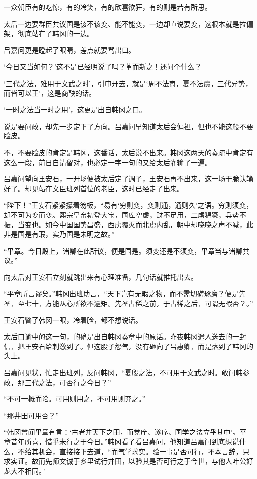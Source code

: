 一众朝臣有的吃惊，有的冷笑，有的欣喜欲狂，有的则是若有所思。

太后一边要群臣共议国是该不该变、能不能变，一边却直说要变，这根本就是拉偏架，彻底站在了韩冈的一边。

吕嘉问更是瞪起了眼睛，差点就要骂出口。

‘今日又当如何？’这不是已经明说了吗？革而新之！还问个什么？

‘三代之法，难用于文武之时’，引申开去，就是‘周不法商，夏不法虞，三代异势，而皆可以王’，这是商鞅的话。

‘一时之法当一时之用’，这更是出自韩冈之口。

说是要问政，却先一步定下了方向。吕嘉问早知道太后会偏袒，但也不能这般不要脸皮。

不，不要脸皮的肯定是韩冈，这番话，太后说不出来。韩冈这两天的奏疏中肯定有这么一段，前日自请留对，也必定一字一句的又给太后灌输了一遍。

吕嘉问望向王安石，一开场便被太后定了调子，王安石再不出来，这一场干脆认输好了。却见站在文臣班列首位的老臣，这时已经走了出来。

“陛下！”王安石紧紧攥着笏板，“易有‘穷则变，变则通，通则久’之语。穷则须变，却不可为变而变。熙宗皇帝初登大宝，国库空虚，财不足用，二虏猖獗，兵势不振，当变也。如今中国国势昌盛，西虏覆灭而北虏内乱，朝中却哓哓之声不减，此非是国是有瑕，实乃国是未明之故。”

“平章。今日殿上，诸卿在此所议，便是国是。须变还是不须变，平章当与诸卿共议。”

向太后对王安石立刻就跳出来有心理准备，几句话就推托出去。

“平章所言谬矣。”韩冈出班助言，“天下岂有无暇之物，而不需切磋琢磨？便是先圣，至七十，方能从心所欲不逾矩。先圣古稀之前，于古稀之后，可谓无暇否？。”

王安石瞥了韩冈一眼，冷着脸，都不想说话。

太后口谕中的这一句，的确是出自韩冈奏章中的原话。昨夜韩冈遣人送去的一封信，把王安石给刺激到了。但这股子怨气，没有砸向了吕惠卿，而是落到了韩冈的头上。

吕嘉问见状，忙走出班列，反问韩冈，“夏殷之法，不可用于文武之时。敢问韩参政，那三代之法，可否行之今日？”

“不可一概而论。可用则用之，不可用则弃之。”

“那井田可用否？”

“韩冈曾闻平章有言：‘古者井天下之田，而党庠、遂序、国学之法立乎其中’。平章昔年所喜，惜乎未行之于今日。”韩冈看了看吕嘉问，他知道吕嘉问到底想说什么，不给其机会，直接接下去道，“而气学求实。验一事是否可行，不本言辞，只求实证。故而先师文诚于乡里试行井田，以验其是否可行之于今世，与他人叶公好龙大不相同。”


